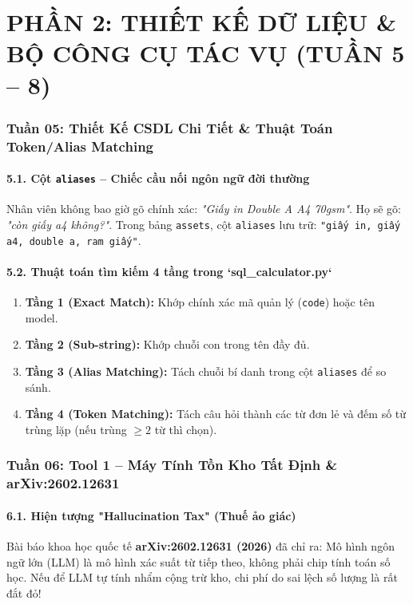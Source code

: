 \documentclass[11pt,a4paper]{article}
\begin{document}
\part*{\Large \color{blue!85!black} PHẦN 2: THIẾT KẾ DỮ LIỆU \& BỘ CÔNG CỤ TÁC VỤ (TUẦN 5 -- 8)}

\section{Tuần 05: Thiết Kế CSDL Chi Tiết \& Thuật Toán Token/Alias Matching}

\subsection{5.1. Cột \texttt{aliases} -- Chiếc cầu nối ngôn ngữ đời thường}
Nhân viên không bao giờ gõ chính xác: \textit{"Giấy in Double A A4 70gsm"}. Họ sẽ gõ: \textit{"còn giấy a4 không?"}. Trong bảng \texttt{assets}, cột \texttt{aliases} lưu trữ: \texttt{"giấy in, giấy a4, double a, ram giấy"}.

\subsection{5.2. Thuật toán tìm kiếm 4 tầng trong `sql\_calculator.py`}
\begin{enumerate}
    \item \textbf{Tầng 1 (Exact Match):} Khớp chính xác mã quản lý (\texttt{code}) hoặc tên model.
    \item \textbf{Tầng 2 (Sub-string):} Khớp chuỗi con trong tên đầy đủ.
    \item \textbf{Tầng 3 (Alias Matching):} Tách chuỗi bí danh trong cột \texttt{aliases} để so sánh.
    \item \textbf{Tầng 4 (Token Matching):} Tách câu hỏi thành các từ đơn lẻ và đếm số từ trùng lặp (nếu trùng $\ge 2$ từ thì chọn).
\end{enumerate}

\section{Tuần 06: Tool 1 -- Máy Tính Tồn Kho Tất Định \& arXiv:2602.12631}

\subsection{6.1. Hiện tượng "Hallucination Tax" (Thuế ảo giác)}
Bài báo khoa học quốc tế \textbf{arXiv:2602.12631 (2026)} đã chỉ ra: Mô hình ngôn ngữ lớn (LLM) là mô hình xác suất từ tiếp theo, không phải chip tính toán số học. Nếu để LLM tự tính nhẩm cộng trừ kho, chi phí do sai lệch số lượng là rất đắt đỏ!
\end{document}
